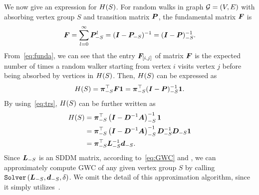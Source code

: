 \documentclass[10pt,twocolumn,twoside]{IEEEtran}
\begin{document}
We now give an expression for \(H(S)\). For random walks in graph \(\mathcal{G}=(V,E)\) with absorbing vertex group \(S\) and transition matrix \(\boldsymbol{P}\),  the fundamental matrix \(\boldsymbol{F}\) is~\cite{ZhYaLi12}    \begin{equation}\label{eq:funda}
    \boldsymbol{F}=\sum_{l=0}^\infty\boldsymbol{P}_{-S}^l=(\boldsymbol{I}-\boldsymbol{P}_{-S})^{-1}=(\boldsymbol{I}-\boldsymbol{P})_{-S}^{-1}.
\end{equation}
From~\eqref{eq:funda}, we can see that  the entry \(\boldsymbol{F}_{[i,j]}\) of matrix  \(\boldsymbol{F}\) is the expected number of times a random walker starting from vertex \(i\) visits vertex \(j\) before being absorbed by vertices in  \(H(S)\). Then, \(H(S)\)  can be expressed as
\begin{equation*}
    H(S)=\boldsymbol{\pi}_{-S}^\top\boldsymbol{F}\boldsymbol{1}=\boldsymbol{\pi}_{-S}^\top(\boldsymbol{I}-\boldsymbol{P})_{-S}^{-1}\boldsymbol{1}.
\end{equation*}
By using~\eqref{eq:trs}, \(H(S)\) can be further written as
\begin{equation}\label{eq:GWC}
    \begin{split}
        H(S) & =\boldsymbol{\pi}_{-S}^\top\left( \boldsymbol{I}-\boldsymbol{D}^{-1}\boldsymbol{A} \right)_{-S}^{-1}\boldsymbol{1}                          \\
        & =\boldsymbol{\pi}_{-S}^\top\left( \boldsymbol{I}-\boldsymbol{D}^{-1}\boldsymbol{A} \right)_{-S}^{-1}\boldsymbol{D}_{-S}^{-1}\boldsymbol{D}_{-S}\boldsymbol{1} \\
        & =\boldsymbol{\pi}_{-S}^\top\boldsymbol{L}_{-S}^{-1}\boldsymbol{d}_{-S}.
    \end{split}
\end{equation}
Since $\boldsymbol{L}_{-S}$ is an SDDM matrix, according to~\eqref{eq:GWC} and , we can approximately compute GWC of any given vertex group \(S\) by calling \(\mathtt{Solver}\left( \boldsymbol{L}_{-S},\boldsymbol{d}_{-S},\delta \right)\). We omit the detail of this approximation algorithm, since  it simply utilizes~.


\end{document}
